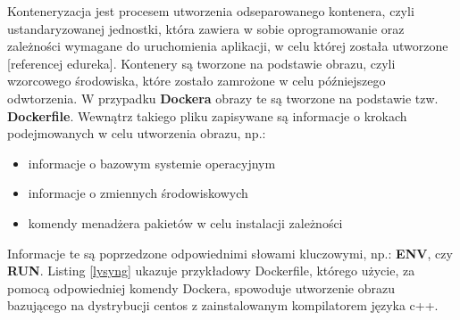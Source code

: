 Konteneryzacja jest procesem utworzenia odseparowanego kontenera, czyli ustandaryzowanej jednostki, która zawiera w sobie oprogramowanie oraz zależności wymagane do uruchomienia aplikacji, w celu której została utworzone [referencej edureka]. Kontenery są tworzone na podstawie obrazu, czyli wzorcowego środowiska, które zostało zamrożone w celu późniejszego odwtorzenia. W przypadku \textbf{Dockera} obrazy te są tworzone na podstawie tzw. \textbf{Dockerfile}. Wewnątrz takiego pliku zapisywane są informacje o krokach podejmowanych w celu utworzenia obrazu, np.:
\begin{itemize}
\item informacje o bazowym systemie operacyjnym
\item informacje o zmiennych środowiskowych
\item komendy menadżera pakietów w celu instalacji zależności
\end{itemize}
Informacje te są poprzedzone odpowiednimi słowami kluczowymi, np.: \textbf{ENV}, czy \textbf{RUN}. Listing \ref{lysyng} ukazuje przykładowy Dockerfile, którego użycie, za pomocą odpowiedniej komendy Dockera, spowoduje utworzenie obrazu bazującego na dystrybucji centos z zainstalowanym kompilatorem języka c++.

\begin{lstlisting}[label={lis:dockerfile}, language=Dockerfile, caption={Przykładowy Dockerfile}]

\end{lstlisting}


